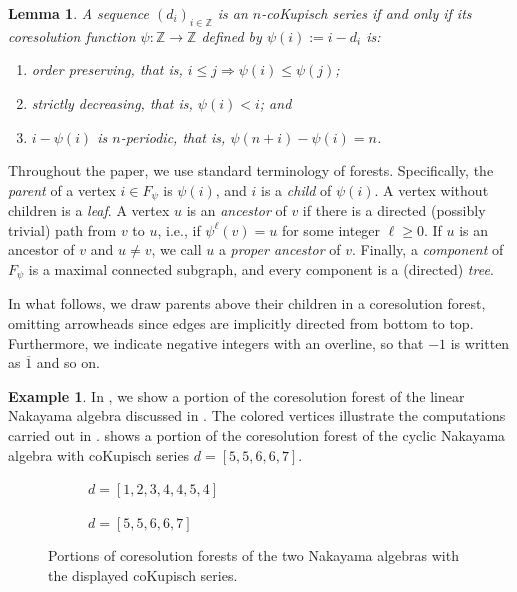 \documentclass[a4paper]{amsart}
\newtheorem{lemma}[theorem]{Lemma}
\theoremstyle{definition}
\newtheorem{example}[theorem]{Example}
\theoremstyle{remark}
\numberwithin{equation}{theorem}
\newcommand{\Dfn}[1]{\emph{\color{blue}#1}} %
\newcommand{\Z}{\mathbb{Z}}
\newcommand{\psiforest}{F_\psi}
\begin{document}
\begin{lemma}\label{prop:cokupisch}
  A sequence $(d_i)_{i\in\Z}$ is an $n$-coKupisch series if and only
  if its coresolution function $\psi:\Z\to\Z$ defined by $\psi(i) := i-d_i$ is:
  \begin{enumerate}
  \item\label{prop:order-preserving} order preserving, that is, $i\leq j\Rightarrow\psi(i)\leq\psi(j)$;
  \item strictly decreasing, that is, $\psi(i)<i$; and
  \item $i - \psi(i)$ is $n$-periodic, that is, $\psi(n+i)-\psi(i)=n$.
  \end{enumerate}
\end{lemma}

Throughout the paper, we use standard terminology of forests. Specifically, the \Dfn{parent} of a vertex $i \in \psiforest$ is $\psi(i)$, and $i$ is a \Dfn{child} of $\psi(i)$. A vertex without children is a \Dfn{leaf}. A vertex $u$ is an \Dfn{ancestor} of $v$ if there is a directed (possibly trivial) path from $v$ to $u$, i.e., if $\psi^\ell(v) = u$ for some integer $\ell \geq 0$.
If $u$ is an ancestor of $v$ and $u \neq v$, we call $u$ a \Dfn{proper ancestor} of $v$.
Finally, a \Dfn{component} of $\psiforest$ is a maximal connected subgraph, and every component is a (directed) \Dfn{tree}.

In what follows, we draw parents above their children in a coresolution forest, omitting arrowheads since edges are implicitly directed from bottom to top. Furthermore, we indicate negative integers with an overline, so that $-1$ is written as $\overline{1}$ and so on.

\begin{example}\label{ex:psiforest}
    In , we show a portion of the coresolution forest of the linear Nakayama algebra discussed in . The colored vertices illustrate the computations carried out in .
     shows a portion of the coresolution forest of the cyclic Nakayama algebra with coKupisch series $d = [5,5,6,6,7]$.
    \begin{figure}[t]
      \begin{subfigure}[t]{0.4\textwidth}
      \centering
        
        \caption{$d = [1,2,3,4,4,5,4]$}
        \label{fig:coresforest-1234454}
      \end{subfigure}\hfill
      \begin{subfigure}[t]{0.4\textwidth}
      \centering
        
        \caption{$d = [5, 5, 6, 6, 7]$}
        \label{fig:coresforest-55667}
      \end{subfigure}\hfill
      \caption{Portions of coresolution forests of the two Nakayama algebras with the displayed coKupisch series.}
      \label{fig:cores-forests-examples}
\end{figure}
\end{example}
\end{document}
